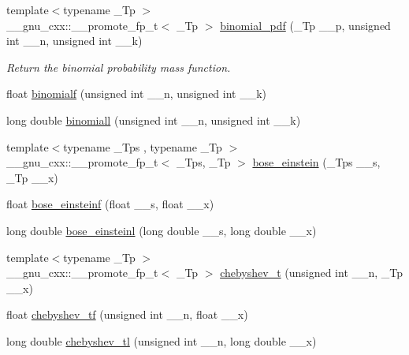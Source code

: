 \begin{DoxyCompactItemize}
{\footnotesize template$<$typename \+\_\+\+Tp $>$ }\\\+\_\+\+\_\+gnu\+\_\+cxx\+::\+\_\+\+\_\+promote\+\_\+fp\+\_\+t$<$ \+\_\+\+Tp $>$ \hyperlink{group__gnu__math__spec__func_gac7bd7c29fb9048ec90f181b473e26ac2}{binomial\+\_\+pdf} (\+\_\+\+Tp \+\_\+\+\_\+p, unsigned int \+\_\+\+\_\+n, unsigned int \+\_\+\+\_\+k)
\begin{DoxyCompactList}\small\item\em Return the binomial probability mass function. \end{DoxyCompactList}\item 
float \hyperlink{group__gnu__math__spec__func_ga3882a077dacc6e627ca48abc05d7db48}{binomialf} (unsigned int \+\_\+\+\_\+n, unsigned int \+\_\+\+\_\+k)
\item 
long double \hyperlink{group__gnu__math__spec__func_ga57602195f9215f735793c11d3210ac93}{binomiall} (unsigned int \+\_\+\+\_\+n, unsigned int \+\_\+\+\_\+k)
\item 
{\footnotesize template$<$typename \+\_\+\+Tps , typename \+\_\+\+Tp $>$ }\\\+\_\+\+\_\+gnu\+\_\+cxx\+::\+\_\+\+\_\+promote\+\_\+fp\+\_\+t$<$ \+\_\+\+Tps, \+\_\+\+Tp $>$ \hyperlink{group__gnu__math__spec__func_gacf63ebbc67ea21d569cf510ed0da95fd}{bose\+\_\+einstein} (\+\_\+\+Tps \+\_\+\+\_\+s, \+\_\+\+Tp \+\_\+\+\_\+x)
\item 
float \hyperlink{group__gnu__math__spec__func_gac1fb313fba5639d4168b6ee682507688}{bose\+\_\+einsteinf} (float \+\_\+\+\_\+s, float \+\_\+\+\_\+x)
\item 
long double \hyperlink{group__gnu__math__spec__func_ga995c3ff580f81afb139f9cd50f445b48}{bose\+\_\+einsteinl} (long double \+\_\+\+\_\+s, long double \+\_\+\+\_\+x)
\item 
{\footnotesize template$<$typename \+\_\+\+Tp $>$ }\\\+\_\+\+\_\+gnu\+\_\+cxx\+::\+\_\+\+\_\+promote\+\_\+fp\+\_\+t$<$ \+\_\+\+Tp $>$ \hyperlink{group__gnu__math__spec__func_gae35c0bc63248e3bcdb9b490477975eb4}{chebyshev\+\_\+t} (unsigned int \+\_\+\+\_\+n, \+\_\+\+Tp \+\_\+\+\_\+x)
\item 
float \hyperlink{group__gnu__math__spec__func_gab8cdb55702d9c8b85af4ecc3d8c6a134}{chebyshev\+\_\+tf} (unsigned int \+\_\+\+\_\+n, float \+\_\+\+\_\+x)
\item 
long double \hyperlink{group__gnu__math__spec__func_ga0c421700d244cdf58e3ac5ff267664d1}{chebyshev\+\_\+tl} (unsigned int \+\_\+\+\_\+n, long double \+\_\+\+\_\+x)
\item 

\end{DoxyCompactItemize}
